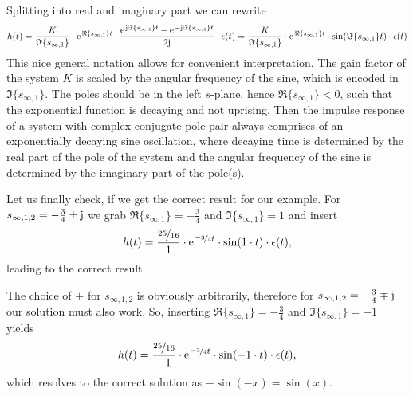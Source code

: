 \documentclass[11pt,a4paper,DIV=12]{scrartcl}
\begin{document}
Splitting into real and imaginary part we can rewrite
\begin{align}
h(t) = \frac{K}{\Im\{s_{\infty,1}\}} \cdot \e^{\Re\{s_{\infty,1}\} t} \cdot \frac{\e^{\im \Im\{s_{\infty,1}\} t}   - \e^{-\im \Im\{s_{\infty,1}\} t}}{2\im} \cdot \epsilon(t)
=
\frac{K}{\Im\{s_{\infty,1}\}} \cdot \e^{\Re\{s_{\infty,1}\} t} \cdot \sin(\Im\{s_{\infty,1}\} t) \cdot \epsilon(t)
\end{align}
%
This nice general notation allows for convenient interpretation.
%
The gain factor of the system $K$ is scaled by the angular frequency of the sine, which
is encoded in $\Im\{s_{\infty,1}\}$.
%
The poles should be in the left $s$-plane, hence $\Re\{s_{\infty,1}\}<0$, such that
the exponential function is decaying and not uprising.
%
Then the impulse response of a system with complex-conjugate
pole pair always comprises of an exponentially decaying sine oscillation,
where decaying time is determined by the real part of the pole of the system
and the angular frequency of the sine is determined by the imaginary part of the
pole(s).

Let us finally check, if we get the correct result for our example.
%
For $s_{\infty,1,2}=-\frac{3}{4}\pm \im$ we grab $\Re\{s_{\infty,1}\} = -\frac{3}{4}$
and $\Im\{s_{\infty,1}\} = 1$ and insert
\begin{align}
h(t)
=
\frac{\nicefrac{25}{16}}{1} \cdot \e^{\nicefrac{-3}{4} t} \cdot \sin(1 \cdot t) \cdot \epsilon(t),
\end{align}
leading to the correct result.

The choice of $\pm$ for $s_{\infty,1,2}$ is obviously arbitrarily, therefore
for $s_{\infty,1,2}=-\frac{3}{4}\mp \im$ our solution must also work.
%
So, inserting $\Re\{s_{\infty,1}\} = -\frac{3}{4}$ and $\Im\{s_{\infty,1}\} = -1$
yields
%
\begin{align} 
h(t)
=
\frac{\nicefrac{25}{16}}{-1} \cdot \e^{\nicefrac{-3}{4} t} \cdot \sin(-1 \cdot t) \cdot \epsilon(t),
\end{align}
which resolves to the correct solution as $-\sin(-x) = \sin(x)$.


\end{document}
